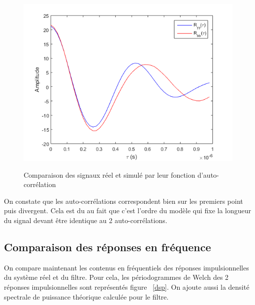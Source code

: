 \documentclass[a4paper]{article}
\begin{document}
\begin{figure}[!h]
	\centering
	\includegraphics[scale=0.7]{autocorr.png}
    \label{autocorr}
    \caption{Comparaison des signaux réel et simulé par leur fonction d'auto-corrélation}
\end{figure}

On constate que les auto-corrélations correspondent bien sur les premiers point puis divergent. Cela est du au fait que c'est l'ordre du modèle qui fixe la longueur du signal devant être identique au 2 auto-corrélations.

\subsection{Comparaison des réponses en fréquence}
On compare maintenant les contenus en fréquentiels des réponses impulsionnelles du système réel et du filtre. Pour cela, les périodogrammes de Welch des 2 réponses impulsionnelles sont représentés figure ~\ref{dsp}. On ajoute aussi la densité spectrale de puissance théorique calculée pour le filtre.
\end{document}

